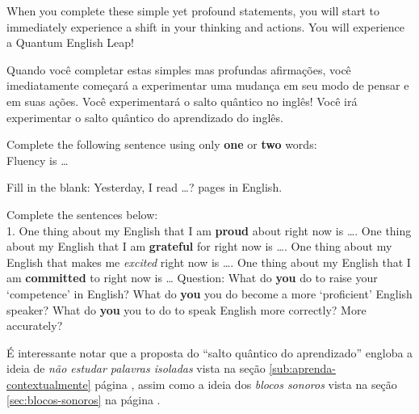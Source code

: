 When you complete these simple yet profound statements, you will start to
immediately experience a shift in your thinking and actions. You will
experience a Quantum English Leap!

Quando você completar estas simples mas profundas afirmações, você imediatamente
começará a experimentar uma mudança em seu modo de pensar e em suas ações. Você
experimentará o salto quântico no inglês! Você irá experimentar o salto quântico
do aprendizado do inglês.

\vspace{0.3\baselineskip}
\noindent
Complete the following sentence using only {\bf one} or {\bf two} words:\\
Fluency is \dots

\vspace{0.3\baselineskip}

\noindent
Fill in the blank: \newline
Yesterday, I read \dots ? pages in English.

\vspace{0.3\baselineskip}
\noindent
Complete the sentences below: \\
1. One thing about my English that I am {\bf proud} about right now is \dots {}. One thing about my English that I am {\bf grateful} for right now is \dots {}. One thing about my English that makes me {\em excited} right now is \dots {}. One thing about my English that I am {\bf committed} to right now is \dots \newline
\newline
Question: \newline
\noindent
What do {\bf you} do to raise your `competence' in English? \newline
What do {\bf you} you do become a more `proficient' English speaker? \newline
What do {\bf you} you to do to speak English more correctly? More accurately? \newline

\noindent É interessante notar que a proposta do ``salto quântico do
aprendizado'' engloba a ideia de {\em não estudar palavras isoladas} vista na seção
\ref{sub:aprenda-contextualmente} página \pageref{sub:aprenda-contextualmente},
assim como a ideia dos {\em blocos sonoros} vista na seção \ref{sec:blocos-sonoros}
na página \pageref{sec:blocos-sonoros}.

